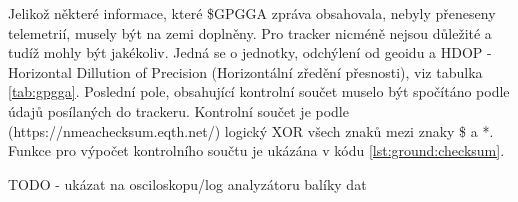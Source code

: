 \documentclass[twoside]{ctuthesis}
\theoremstyle{plain}
\theoremstyle{definition}
\theoremstyle{note}
\begin{document}
	

	

	Jelikož některé informace, které \$GPGGA zpráva obsahovala, nebyly přeneseny telemetrií, musely být na zemi doplněny. Pro tracker nicméně nejsou důležité a tudíž mohly být jakékoliv. Jedná se o jednotky, odchýlení od geoidu a HDOP - Horizontal Dillution of Precision (Horizontální zředění přesnosti), viz tabulka \ref{tab:gpgga}. Poslední pole, obsahující kontrolní součet muselo být spočítáno podle údajů posílaných do trackeru. Kontrolní součet je podle (https://nmeachecksum.eqth.net/) logický XOR všech znaků mezi znaky \$ a *. Funkce pro výpočet kontrolního součtu je ukázána v kódu \ref{lst:ground:checksum}.

	

	TODO - ukázat na osciloskopu/log analyzátoru balíky dat
\end{document}
